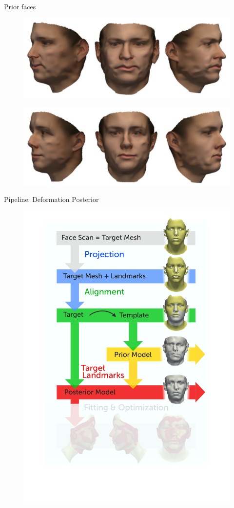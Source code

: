 \documentclass[xcolor=x11names,compress]{beamer}
\begin{document}
\begin{frame}{Prior faces}
    \begin{figure}
    \centering
    \includegraphics[width=.9\textwidth]{../resources/img/prior_sample_2_profile.pdf}
\end{figure}
\begin{figure}
    \centering
    \includegraphics[width=.9\textwidth]{../resources/img/prior_sample_3_profile.pdf}
\end{figure}

\end{frame}
\begin{frame}{Pipeline: Deformation Posterior}
\begin{figure}   
\centering
\includegraphics[width=.6\textwidth]{../resources/figures/pipeline_posterior.pdf}
\end{figure}
\end{frame}
\end{document}
